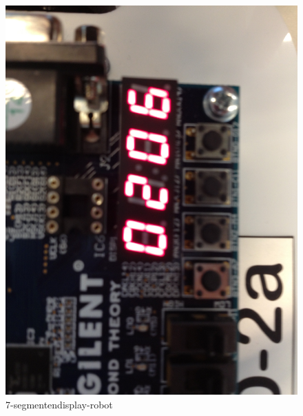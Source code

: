 \documentclass{report}
\begin{document}
\begin{figure}[H]
\centering
\includegraphics{7_segment_display-robot.jpg}

\caption{7-segmentendisplay-robot}
\end{figure}

\newpage
\end{document}
